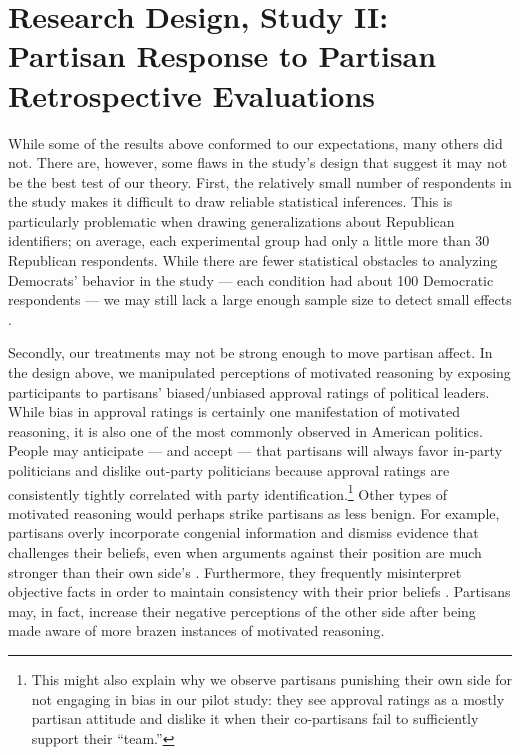 \documentclass[12pt, letterpaper]{article}
\begin{document}
{\section*{Research Design, Study II: Partisan Response to Partisan Retrospective Evaluations}

While some of the results above conformed to our expectations, many others did not. There are, however, some flaws in the study's design that suggest it may not be the best test of our theory. First, the relatively small number of respondents in the study makes it difficult to draw reliable statistical inferences. This is particularly problematic when drawing generalizations about Republican identifiers; on average, each experimental group had only a little more than 30 Republican respondents. While there are fewer statistical obstacles to analyzing Democrats' behavior in the study --- each condition had about 100 Democratic respondents --- we may still lack a large enough sample size to detect small effects \citep[e.g.,][]{cohen_1992}. 

Secondly, our treatments may not be strong enough to move partisan affect. In the design above, we manipulated perceptions of motivated reasoning by exposing participants to partisans' biased/unbiased approval ratings of political leaders. While bias in approval ratings is certainly one manifestation of motivated reasoning, it is also one of the most commonly observed in American politics. People may anticipate --- and accept --- that partisans will always favor in-party politicians and dislike out-party politicians because approval ratings are consistently tightly correlated with party identification.\footnote{This might also explain why we observe partisans punishing their own side for not engaging in bias in our pilot study: they see approval ratings as a mostly partisan attitude and dislike it when their co-partisans fail to sufficiently support their ``team.''} Other types of motivated reasoning would perhaps strike partisans as less benign. For example, partisans overly incorporate congenial information and dismiss evidence that challenges their beliefs, even when arguments against their position are much stronger than their own side's \citep{druckmanetal_2013,taber2006}. Furthermore, they frequently misinterpret objective facts in order to maintain consistency with their prior beliefs \citep{bartels_2002,gainesetal_2007}. Partisans may, in fact, increase their negative perceptions of the other side after being made aware of more brazen instances of motivated reasoning. 

}
\end{document}
